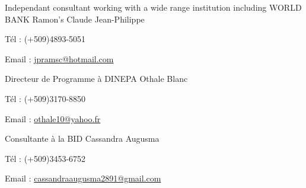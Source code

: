 


\begin{cventries}


\cventry
{Independant consultant working with a wide range institution including WORLD BANK} %
{Ramon's Claude Jean-Philippe} %
{} %
{} %
{ %
\begin{cvitems}
\item {Tél : (+509)4893-5051}
\item {Email : \url{jpramsc@hotmail.com}}
\end{cvitems}
}


\cventry
{Directeur de Programme à DINEPA} %
{Othale Blanc} %
{} %
{} %
{ %
\begin{cvitems}
\item {Tél : (+509)3170-8850}
\item {Email : \url{othale10@yahoo.fr}}
\end{cvitems}
}


\cventry
{Consultante à la BID} %
{Cassandra Augusma} %
{} %
{} %
{ %
\begin{cvitems}
\item {Tél : (+509)3453-6752}
\item {Email : \url{cassandraaugusma2891@gmail.com}}
\end{cvitems}
}

\end{cventries}